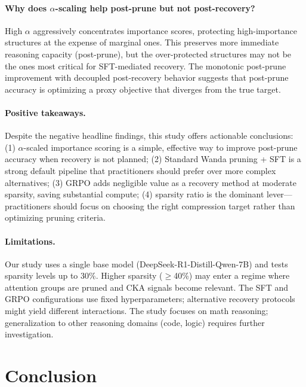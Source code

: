 \documentclass[11pt,a4paper]{article}
\begin{document}
\paragraph{Why does $\alpha$-scaling help post-prune but not post-recovery?}
High $\alpha$ aggressively concentrates importance scores, protecting high-importance structures at the expense of marginal ones. This preserves more immediate reasoning capacity (post-prune), but the over-protected structures may not be the ones most critical for SFT-mediated recovery. The monotonic post-prune improvement with decoupled post-recovery behavior suggests that post-prune accuracy is optimizing a proxy objective that diverges from the true target.

\paragraph{Positive takeaways.}
Despite the negative headline findings, this study offers actionable conclusions: (1) $\alpha$-scaled importance scoring is a simple, effective way to improve post-prune accuracy when recovery is not planned; (2) Standard Wanda pruning + SFT is a strong default pipeline that practitioners should prefer over more complex alternatives; (3) GRPO adds negligible value as a recovery method at moderate sparsity, saving substantial compute; (4) sparsity ratio is the dominant lever---practitioners should focus on choosing the right compression target rather than optimizing pruning criteria.

\paragraph{Limitations.}
Our study uses a single base model (DeepSeek-R1-Distill-Qwen-7B) and tests sparsity levels up to 30\%. Higher sparsity ($\geq$40\%) may enter a regime where attention groups are pruned and CKA signals become relevant. The SFT and GRPO configurations use fixed hyperparameters; alternative recovery protocols might yield different interactions. The study focuses on math reasoning; generalization to other reasoning domains (code, logic) requires further investigation.


\section{Conclusion}
\label{sec:conclusion}
\end{document}
